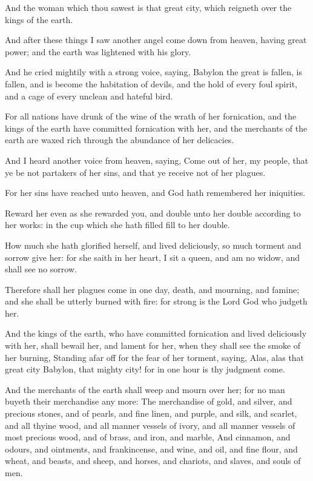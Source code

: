 \Verse And the woman which thou sawest is that great city, which reigneth over the kings of the earth.

\Chapter
\Verse And after these things I saw another angel come down from heaven, having great power; and the earth was lightened with his glory.

\Verse And he cried mightily with a strong voice, saying, Babylon the great is fallen, is fallen, and is become the habitation of devils, and the hold of every foul spirit, and a cage of every unclean and hateful bird.

\Verse For all nations have drunk of the wine of the wrath of her fornication, and the kings of the earth have committed fornication with her, and the merchants of the earth are waxed rich through the abundance of her delicacies.

\Verse And I heard another voice from heaven, saying, Come out of her, my people, that ye be not partakers of her sins, and that ye receive not of her plagues.

\Verse For her sins have reached unto heaven, and God hath remembered her iniquities.

\Verse Reward her even as she rewarded you, and double unto her double according to her works: in the cup which she hath filled fill to her double.

\Verse How much she hath glorified herself, and lived deliciously, so much torment and sorrow give her: for she saith in her heart, I sit a queen, and am no widow, and shall see no sorrow.

\Verse Therefore shall her plagues come in one day, death, and mourning, and famine; and she shall be utterly burned with fire: for strong is the Lord God who judgeth her.

\Verse And the kings of the earth, who have committed fornication and lived deliciously with her, shall bewail her, and lament for her, when they shall see the smoke of her burning, \Verse Standing afar off for the fear of her torment, saying, Alas, alas that great city Babylon, that mighty city! for in one hour is thy judgment come.

\Verse And the merchants of the earth shall weep and mourn over her; for no man buyeth their merchandise any more: \Verse The merchandise of gold, and silver, and precious stones, and of pearls, and fine linen, and purple, and silk, and scarlet, and all thyine wood, and all manner vessels of ivory, and all manner vessels of most precious wood, and of brass, and iron, and marble, \Verse And cinnamon, and odours, and ointments, and frankincense, and wine, and oil, and fine flour, and wheat, and beasts, and sheep, and horses, and chariots, and slaves, and souls of men.

